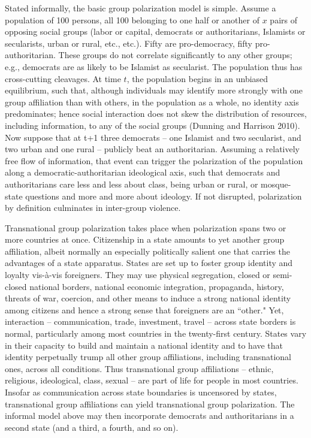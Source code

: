 \documentclass[12pt]{article}
\begin{document}
Stated informally, the basic group polarization model is simple.  Assume a population of 100 persons, all 100 belonging to one half or another of $x$ pairs of opposing social groups (labor or capital, democrats or authoritarians, Islamists or secularists, urban or rural, etc., etc.).  Fifty are pro-democracy, fifty pro-authoritarian.  These groups do not correlate significantly to any other groups; e.g., democrats are as likely to be Islamist as secularist.  The population thus has cross-cutting cleavages.   At time $t$, the population begins in an unbiased equilibrium, such that, although individuals may identify more strongly with one group affiliation than with others, in the population as a whole, no identity axis predominates; hence social interaction does not skew the distribution of resources, including information, to any of the social groups (Dunning and Harrison 2010).  Now suppose that at t+1 three democrats – one Islamist and two secularist, and two urban and one rural – publicly beat an authoritarian.  Assuming a relatively free flow of information, that event can trigger the polarization of the population along a democratic-authoritarian ideological axis, such that democrats and authoritarians care less and less about class, being urban or rural, or mosque-state questions and more and more about ideology.  If not disrupted, polarization by definition culminates in inter-group violence.

Transnational group polarization takes place when polarization spans two or more countries at once.  Citizenship in a state amounts to yet another group affiliation, albeit normally an especially politically salient one that carries the advantages of a state apparatus.  States are set up to foster group identity and loyalty vis-à-vis foreigners.  They may use physical segregation, closed or semi-closed national borders, national economic integration, propaganda, history, threats of war, coercion, and other means to induce a strong national identity among citizens and hence a strong sense that foreigners are an ``other."  Yet, interaction – communication, trade, investment, travel – across state borders is normal, particularly among most countries in the twenty-first century.   States vary in their capacity to build and maintain a national identity and to have that identity perpetually trump all other group affiliations, including transnational ones, across all conditions.   Thus transnational group affiliations – ethnic, religious, ideological, class, sexual – are part of life for people in most countries.  Insofar as communication across state boundaries is uncensored by states, transnational group affiliations can yield transnational group polarization.  The informal model above may then incorporate democrats and authoritarians in a second state (and a third, a fourth, and so on).
\end{document}
